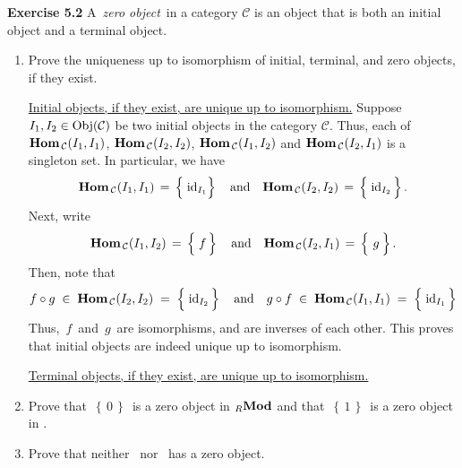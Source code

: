 \vskip 0.5cm
\noindent
\textbf{Exercise 5.2}
\vskip 0.2cm
\noindent
A \,\textit{zero object}\, in a category $\mathcal{C}$ is an object that is both an initial object
and a terminal object.
\begin{enumerate}
\item
	Prove the uniqueness up to isomorphism of initial, terminal, and zero objects, if they exist.
	
	\proof
	\vskip 0.2cm
	\underline{Initial objects, if they exist, are unique up to isomorphism.}
	\vskip 0.0cm
	Suppose $I_{1}, I_{2} \in \textnormal{Obj}(\mathcal{C})$ be two initial objects in the category $\mathcal{C}$.
	Thus, each of $\textbf{Hom}_{\,\mathcal{C}}(I_{1},I_{1})$, $\textbf{Hom}_{\,\mathcal{C}}(I_{2},I_{2})$,
	$\textbf{Hom}_{\,\mathcal{C}}(I_{1},I_{2})$ and $\textbf{Hom}_{\,\mathcal{C}}(I_{2},I_{1})$ is a singleton set.
	In particular, we have
	\begin{equation*}
	\Hom_{\,\mathcal{C}}(I_{1},I_{1}) \,=\, \left\{\;\overset{{\color{white}.}}{\id}_{I_{1}}\right\}
	\quad\textnormal{and}\quad
	\Hom_{\,\mathcal{C}}(I_{2},I_{2}) \,=\, \left\{\;\overset{{\color{white}.}}{\id}_{I_{2}}\,\right\}.
	\end{equation*}
	Next, write
	\begin{equation*}
	\Hom_{\,\mathcal{C}}(I_{1},I_{2}) \,=\, \left\{\;\overset{{\color{white}.}}{f}\,\right\}
	\quad\textnormal{and}\quad
	\Hom_{\,\mathcal{C}}(I_{2},I_{1}) \,=\, \left\{\;\overset{{\color{white}-}}{g}\,\right\}.
	\end{equation*}
	Then, note that
	\begin{equation*}
	f \circ g \;\in\; \Hom_{\,\mathcal{C}}(I_{2},I_{2}) \;=\; \left\{\;\overset{{\color{white}.}}{\id}_{I_{2}}\,\right\}
	\quad\textnormal{and}\quad
	g \circ f \;\in\; \Hom_{\,\mathcal{C}}(I_{1},I_{1}) \;=\; \left\{\;\overset{{\color{white}.}}{\id}_{I_{1}}\,\right\}
	\end{equation*}
	Thus, \,$f$\, and \,$g$\, are isomorphisms, and are inverses of each other.
	This proves that initial objects are indeed unique up to isomorphism.

	\vskip 0.2cm
	\underline{Terminal objects, if they exist, are unique up to isomorphism.}
	\vskip 0.0cm

\item
	Prove that \,$\left\{\,0\,\right\}$\, is a zero object in $_{R}\textbf{Mod}$ and that
	\,$\left\{\,1\,\right\}$\, is a zero object in \Groups.
	
\item
	Prove that neither \Sets\, nor \Top\, has a zero object.
	
\end{enumerate}


\renewcommand{\theenumi}{\roman{enumi}}
\renewcommand{\labelenumi}{\textnormal{(\theenumi)}$\;\;$}


